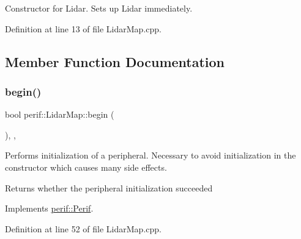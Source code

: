 Constructor for Lidar. Sets up Lidar immediately. 

Definition at line 13 of file Lidar\+Map.\+cpp.


\begin{DoxyCode}{0}

\end{DoxyCode}


\subsection{Member Function Documentation}
\mbox{\label{classperif_1_1LidarMap_a1d0db064c7664aa8014cbd9fe42773ff}} 
\subsubsection{\texorpdfstring{begin()}{begin()}}
{\footnotesize\ttfamily bool perif\+::\+Lidar\+Map\+::begin (\begin{DoxyParamCaption}{ }\end{DoxyParamCaption})\hspace{0.3cm}{\ttfamily [override]}, {\ttfamily [protected]}, {\ttfamily [virtual]}}

Performs initialization of a peripheral. Necessary to avoid initialization in the constructor which causes many side effects.

\begin{DoxyReturn}{Returns}
whether the peripheral initialization succeeded 
\end{DoxyReturn}


Implements \mbox{\hyperlink{classperif_1_1Perif_ae7f1d1a4e9cd2343d51abc4ee21000cf}{perif\+::\+Perif}}.



Definition at line 52 of file Lidar\+Map.\+cpp.


\begin{DoxyCode}{0}

\end{DoxyCode}
\mbox{\label{classperif_1_1LidarMap_a7e7bc5c72157dcaccb282004528ffdcf}} 
